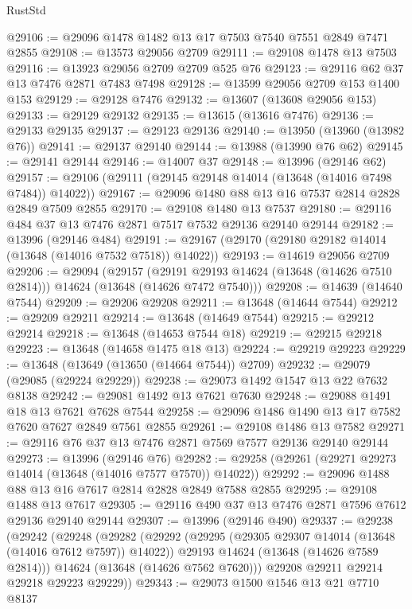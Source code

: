 \begin{lexlean}{RustStd}
\begin{coremodule}
@29106 := @29096 @1478 @1482 @13 @17 @7503 @7540 @7551 @2849 @7471 @2855
@29108 := @13573 @29056 @2709
@29111 := @29108 @1478 @13 @7503
@29116 := @13923 @29056 @2709 @2709 @525 @76
@29123 := @29116 @62 @37 @13 @7476 @2871 @7483 @7498
@29128 := @13599 @29056 @2709 @153 @1400 @153
@29129 := @29128 @7476
@29132 := @13607 (@13608 @29056 @153)
@29133 := @29129 @29132
@29135 := @13615 (@13616 @7476)
@29136 := @29133 @29135
@29137 := @29123 @29136
@29140 := @13950 (@13960 (@13982 @76))
@29141 := @29137 @29140
@29144 := @13988 (@13990 @76 @62)
@29145 := @29141 @29144
@29146 := @14007 @37
@29148 := @13996 (@29146 @62)
@29157 := @29106 (@29111 (@29145 @29148 @14014 (@13648 (@14016 @7498 @7484)) @14022))
@29167 := @29096 @1480 @88 @13 @16 @7537 @2814 @2828 @2849 @7509 @2855
@29170 := @29108 @1480 @13 @7537
@29180 := @29116 @484 @37 @13 @7476 @2871 @7517 @7532 @29136 @29140 @29144
@29182 := @13996 (@29146 @484)
@29191 := @29167 (@29170 (@29180 @29182 @14014 (@13648 (@14016 @7532 @7518)) @14022))
@29193 := @14619 @29056 @2709
@29206 := @29094
    (@29157
      (@29191 @29193 @14624 (@13648 (@14626 @7510 @2814)))
      @14624
      (@13648 (@14626 @7472 @7540)))
@29208 := @14639 (@14640 @7544)
@29209 := @29206 @29208
@29211 := @13648 (@14644 @7544)
@29212 := @29209 @29211
@29214 := @13648 (@14649 @7544)
@29215 := @29212 @29214
@29218 := @13648 (@14653 @7544 @18)
@29219 := @29215 @29218
@29223 := @13648 (@14658 @1475 @18 @13)
@29224 := @29219 @29223
@29229 := @13648 (@13649 (@13650 (@14664 @7544)) @2709)
@29232 := @29079 (@29085 (@29224 @29229))
@29238 := @29073 @1492 @1547 @13 @22 @7632 @8138
@29242 := @29081 @1492 @13 @7621 @7630
@29248 := @29088 @1491 @18 @13 @7621 @7628 @7544
@29258 := @29096 @1486 @1490 @13 @17 @7582 @7620 @7627 @2849 @7561 @2855
@29261 := @29108 @1486 @13 @7582
@29271 := @29116 @76 @37 @13 @7476 @2871 @7569 @7577 @29136 @29140 @29144
@29273 := @13996 (@29146 @76)
@29282 := @29258 (@29261 (@29271 @29273 @14014 (@13648 (@14016 @7577 @7570)) @14022))
@29292 := @29096 @1488 @88 @13 @16 @7617 @2814 @2828 @2849 @7588 @2855
@29295 := @29108 @1488 @13 @7617
@29305 := @29116 @490 @37 @13 @7476 @2871 @7596 @7612 @29136 @29140 @29144
@29307 := @13996 (@29146 @490)
@29337 := @29238
    (@29242
      (@29248
        (@29282
          (@29292
            (@29295 (@29305 @29307 @14014 (@13648 (@14016 @7612 @7597)) @14022))
            @29193
            @14624
            (@13648 (@14626 @7589 @2814)))
          @14624
          (@13648 (@14626 @7562 @7620)))
        @29208
        @29211
        @29214
        @29218
        @29223
        @29229))
@29343 := @29073 @1500 @1546 @13 @21 @7710 @8137

\end{coremodule}
\end{lexlean}
